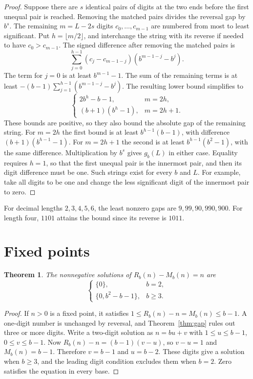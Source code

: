 \documentclass[11pt]{article}
\newtheorem{theorem}{Theorem}
\begin{document}
\begin{proof}
Suppose there are \(s\) identical pairs of digits at the two ends before the first unequal pair is reached. Removing the matched pairs divides the reversal gap by \(b^s\). The remaining \(m=L-2s\) digits \(c_0,\ldots,c_{m-1}\) are numbered from most to least significant. Put \(h=\lfloor m/2\rfloor\), and interchange the string with its reverse if needed to have \(c_0>c_{m-1}\). The signed difference after removing the matched pairs is
\[
\sum_{j=0}^{h-1}(c_j-c_{m-1-j})(b^{m-1-j}-b^j).
\]
The term for \(j=0\) is at least \(b^{m-1}-1\). The sum of the remaining terms is at least
\(- (b-1)\sum_{j=1}^{h-1}(b^{m-1-j}-b^j)\).
The resulting lower bound simplifies to
\[
\begin{cases}
2b^h-b-1, & m=2h,\\
(b+1)(b^h-1), & m=2h+1.
\end{cases}
\]
These bounds are positive, so they also bound the absolute gap of the remaining string. For \(m=2h\) the first bound is at least \(b^{h-1}(b-1)\), with difference \((b+1)(b^{h-1}-1)\). For \(m=2h+1\) the second is at least \(b^{h-1}(b^2-1)\), with the same difference. Multiplication by \(b^s\) gives \(g_b(L)\) in either case. Equality requires \(h=1\), so that the first unequal pair is the innermost pair, and then its digit difference must be one. Such strings exist for every \(b\) and \(L\). For example, take all digits to be one and change the less significant digit of the innermost pair to zero.
\end{proof}

For decimal lengths \(2,3,4,5,6\), the least nonzero gaps are \(9,99,90,990,900\). For length four, \(1101\) attains the bound since its reverse is \(1011\).

\section{Fixed points}

\begin{theorem}\label{thm:fixed}
The nonnegative solutions of \(R_b(n)-M_b(n)=n\) are
\[
\begin{cases}
\{0\}, & b=2,\\
\{0,b^2-b-1\}, & b\ge3.
\end{cases}
\]
\end{theorem}

\begin{proof}
If \(n>0\) is a fixed point, it satisfies
\(1\le R_b(n)-n=M_b(n)\le b-1\). A one-digit number is unchanged by reversal, and Theorem~\ref{thm:gap} rules out three or more digits. Write a two-digit solution as \(n=bu+v\) with \(1\le u\le b-1\), \(0\le v\le b-1\). Now \(R_b(n)-n=(b-1)(v-u)\), so \(v-u=1\) and \(M_b(n)=b-1\). Therefore \(v=b-1\) and \(u=b-2\). These digits give a solution when \(b\ge3\), and the leading digit condition excludes them when \(b=2\). Zero satisfies the equation in every base.
\end{proof}
\end{document}
